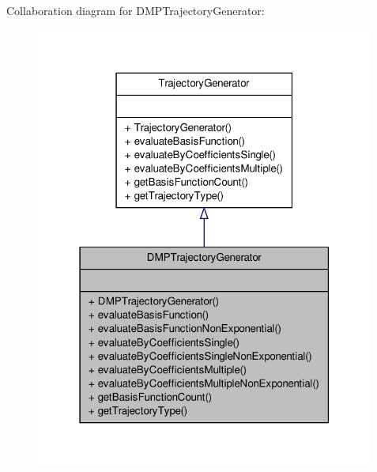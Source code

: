 \-Collaboration diagram for \-D\-M\-P\-Trajectory\-Generator\-:\nopagebreak
\begin{figure}[H]
\begin{center}
\leavevmode
\includegraphics[width=316pt]{classDMPTrajectoryGenerator__coll__graph}
\end{center}
\end{figure}
